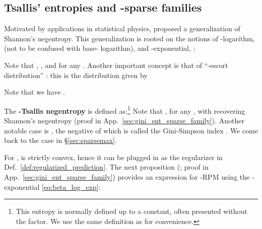 \documentclass{article}
\newcommand{\remove}[1]{}
\begin{document}
\subsection{Tsallis' entropies and -sparse families}

Motivated by applications in statistical physics,
\citet{Tsallis1988} proposed a generalization of Shannon's negentropy. 
This generalization is rooted on the notions of  -logarithm,  (not to be confused with base- logarithm), and -exponential, : 

Note that , , and  for any . 
Another important concept is that of ``-escort distribution''  \citep{Tsallis1988}: this is the distribution  given by

Note that we have . 

The {\bf -Tsallis negentropy}  \citep{havrda1967quantification,Tsallis1988} is defined as:\footnote{This entropy is normally defined up to a constant, often presented without the  factor. We use the same definition as \citet[\S 4.3]{blondel2020learning} for convenience.} 
Note that , for any , 
with  recovering Shannon's negentropy (proof in App.~\ref{sec:gini_ent_sparse_family}). 
Another notable case is ,
the negative of which is called the Gini-Simpson index \citep{Jost2006,Rao1982}. 
We come back to the  case in \S\ref{sec:sparsemax}.

\remove{
This family is continuous in , \textit{i.e.}, , for any , with  recovering Shannon's negentropy (proof in App.~\ref{sec:gini_ent_sparse_family}). 
Another notable case is ,
the negative of which has several names, {\it e.g.}, Gini-Simpson index \citep{Jost2006} or Rao's quadratic entropy \citep{Rao1982}. 
We will come back to the  case in \S\ref{sec:sparsemax}.
}

For ,  is strictly convex, hence it can be plugged in as the regularizer in  Def.~\ref{def:regularized_prediction}. 
The next proposition (\citep{naudts2009q}; proof in  App.~\ref{sec:gini_ent_sparse_family}) provides an expression for -RPM using the -exponential  \eqref{eq:beta_log_exp}: 





\begin{comment}
\vspace{0.15cm}
\begin{proposition}\label{prop:solution_rpm_tsallis}
For  and , 

where  is a coefficient that ensures normalization.
\end{proposition}
\end{comment}
\end{document}

